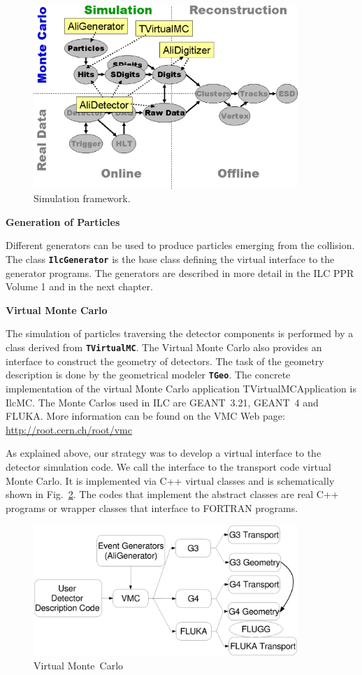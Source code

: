 \documentclass[12pt,a4paper,twoside]{article}
\makeatletter
\newcommand{\class}[1]{\texttt{\textbf{#1}}\xspace}
\newcommand {\MC} {Monte~Carlo\@\xspace}
\makeatother
\begin{document}
\begin{figure}[ht]
  \centering
  \includegraphics[width=10cm]{picts/SimulationFramework}
  \caption{Simulation framework.} \label{MC:Simulation}
\end{figure}


\noindent
\textbf{Generation of Particles}

Different generators can be used to produce particles emerging from
the collision. The class \class{IlcGenerator} is the base class
defining the virtual interface to the generator programs. The
generators are described in more detail in the ILC PPR Volume 1 and
in the next chapter.

\noindent
\textbf{Virtual Monte Carlo}

The simulation of particles traversing the detector components is
performed by a class derived from \class{TVirtualMC}. The Virtual
Monte Carlo also provides an interface to construct the geometry of
detectors. The task of the geometry description is done by the
geometrical modeler \class{TGeo}. The concrete implementation of the
virtual Monte Carlo application TVirtualMCApplication is IlcMC. The
Monte Carlos used in ILC are GEANT~3.21, GEANT~4 and FLUKA. More
information can be found on the VMC Web page:
\url{http://root.cern.ch/root/vmc}

As explained above, our strategy was to develop a virtual interface to
the detector simulation code. We call the interface to the transport
code virtual Monte Carlo. It is implemented via C++ virtual classes
and is schematically shown in Fig.~\ref{MC:vmc}. The codes that
implement the abstract classes are real C++ programs or wrapper
classes that interface to FORTRAN programs.

\begin{figure}[ht]
  \centering
  \includegraphics[width=10cm]{picts/vmc}
  \caption{Virtual \MC} \label{MC:vmc}
\end{figure}
\end{document}
